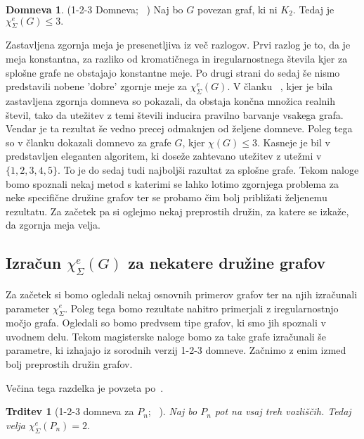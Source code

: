 \documentclass[12pt,a4paper,twoside]{article}
\theoremstyle{definition} %
\newtheorem{domneva}[definicija]{Domneva}
\theoremstyle{plain} %
\newtheorem{trditev}[definicija]{Trditev}
\newcommand{\ec}{\chi_{\Sigma}^e}
\numberwithin{equation}{section}  %
\begin{document}
\begin{domneva} 
	\label{123conjecture}
	(1-2-3 Domneva; ~\citet{base}) Naj bo $G$ povezan graf, ki ni $K_2$. Tedaj je $\ec(G) \le 3.$ 
\end{domneva}
Zastavljena zgornja meja je presenetljiva iz več razlogov. Prvi razlog je to, da je meja konstantna, za razliko od kromatičnega in iregularnostnega števila kjer za splošne grafe ne obstajajo konstantne meje. Po drugi strani do sedaj še nismo predstavili nobene 'dobre' zgornje meje za $\ec(G)$. V članku ~\cite{base}, kjer je bila zastavljena zgornja domneva so pokazali, da obstaja končna množica realnih števil, tako da utežitev z temi števili inducira pravilno barvanje vsakega grafa. Vendar je ta rezultat še vedno precej odmaknjen od željene domneve. Poleg tega so v članku dokazali domnevo za grafe $G$, kjer $\chi(G) \le 3$.
 Kasneje je bil v ~\cite{proof12345} predstavljen eleganten algoritem, ki doseže zahtevano utežitev z utežmi v $\{1,2,3,4,5\}$. To je do sedaj tudi najboljši razultat za splošne grafe. Tekom naloge bomo spoznali nekaj metod s katerimi se lahko lotimo zgornjega problema za neke specifične družine grafov ter se probamo čim bolj približati željenemu rezultatu. Za začetek pa si oglejmo nekaj preprostih družin, za katere se izkaže, da zgornja meja velja.

\subsection{Izračun $\ec(G)$ za nekatere družine grafov}

Za začetek si bomo ogledali nekaj osnovnih primerov grafov ter na njih izračunali parameter $\ec$. Poleg tega bomo rezultate nahitro primerjali z iregularnostnjo močjo grafa. Ogledali so bomo predvsem tipe grafov, ki smo jih spoznali v uvodnem delu. Tekom magisterske naloge bomo za take grafe izračunali še parametre, ki izhajajo iz sorodnih verzij 1-2-3 domneve. Začnimo z enim izmed bolj preprostih družin grafov.

Večina tega razdelka je povzeta po~\cite{examples}.
\begin{trditev}[1-2-3 domneva za $P_n$; ~\citet{examples}]
Naj bo $P_n$ pot na vsaj treh vozliščih. Tedaj velja $\ec(P_n) = 2.$
\end{trditev}
\end{document}
